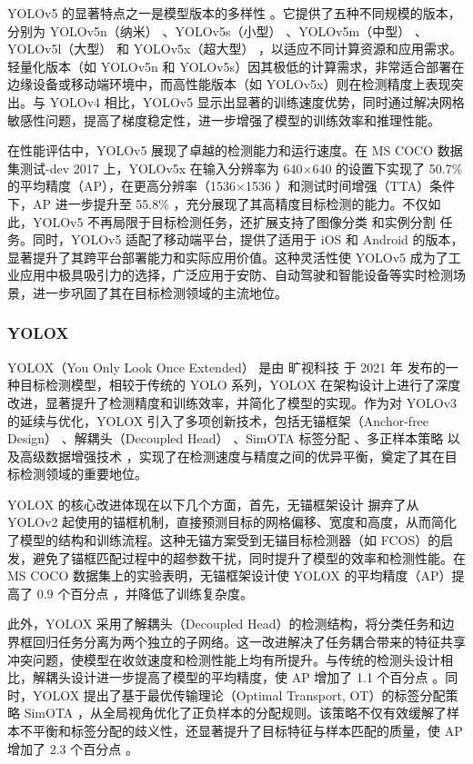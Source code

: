 \documentclass[11pt,twocolumn]{ctexart}
\begin{document}
YOLOv5 的显著特点之一是模型版本的多样性 。它提供了五种不同规模的版本，分别为 YOLOv5n（纳米） 、YOLOv5s（小型） 、YOLOv5m（中型） 、YOLOv5l（大型） 和 YOLOv5x（超大型） ，以适应不同计算资源和应用需求。轻量化版本（如 YOLOv5n 和 YOLOv5s）因其极低的计算需求，非常适合部署在边缘设备或移动端环境中，而高性能版本（如 YOLOv5x）则在检测精度上表现突出。与 YOLOv4 相比，YOLOv5 显示出显著的训练速度优势，同时通过解决网格敏感性问题，提高了梯度稳定性，进一步增强了模型的训练效率和推理性能。

在性能评估中，YOLOv5 展现了卓越的检测能力和运行速度。在 MS COCO 数据集测试-dev 2017 上，YOLOv5x 在输入分辨率为 640×640 的设置下实现了 50.7\% 的平均精度（AP），在更高分辨率（1536×1536 ）和测试时间增强（TTA）条件下，AP 进一步提升至 55.8\% ，充分展现了其高精度目标检测的能力。不仅如此，YOLOv5 不再局限于目标检测任务，还扩展支持了图像分类 和实例分割 任务。同时，YOLOv5 适配了移动端平台，提供了适用于 iOS 和 Android 的版本，显著提升了其跨平台部署能力和实际应用价值。这种灵活性使 YOLOv5 成为了工业应用中极具吸引力的选择，广泛应用于安防、自动驾驶和智能设备等实时检测场景，进一步巩固了其在目标检测领域的主流地位。
\subsubsection{YOLOX}
YOLOX（You Only Look Once Extended）\cite{ge2021yolox} 是由 旷视科技 于 2021 年 发布的一种目标检测模型，相较于传统的 YOLO 系列，YOLOX 在架构设计上进行了深度改进，显著提升了检测精度和训练效率，并简化了模型的实现。作为对 YOLOv3 的延续与优化，YOLOX 引入了多项创新技术，包括无锚框架（Anchor-free Design） 、解耦头（Decoupled Head） 、SimOTA 标签分配 、多正样本策略 以及高级数据增强技术 ，实现了在检测速度与精度之间的优异平衡，奠定了其在目标检测领域的重要地位。

YOLOX 的核心改进体现在以下几个方面，首先，无锚框架设计 摒弃了从 YOLOv2 起使用的锚框机制，直接预测目标的网格偏移、宽度和高度，从而简化了模型的结构和训练流程。这种无锚方案受到无锚目标检测器（如 FCOS）的启发，避免了锚框匹配过程中的超参数干扰，同时提升了模型的效率和检测性能。在 MS COCO 数据集上的实验表明，无锚框架设计使 YOLOX 的平均精度（AP）提高了 0.9 个百分点 ，并降低了训练复杂度。

此外，YOLOX 采用了解耦头（Decoupled Head）的检测结构，将分类任务和边界框回归任务分离为两个独立的子网络。这一改进解决了任务耦合带来的特征共享冲突问题，使模型在收敛速度和检测性能上均有所提升。与传统的检测头设计相比，解耦头设计进一步提高了模型的平均精度，使 AP 增加了 1.1 个百分点 。同时，YOLOX 提出了基于最优传输理论（Optimal Transport, OT）的标签分配策略 SimOTA ，从全局视角优化了正负样本的分配规则。该策略不仅有效缓解了样本不平衡和标签分配的歧义性，还显著提升了目标特征与样本匹配的质量，使 AP 增加了 2.3 个百分点 。
\end{document}

